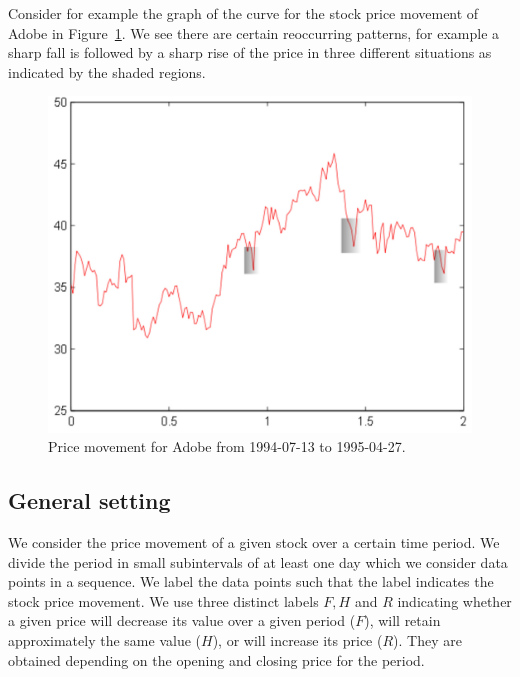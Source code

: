 \documentclass[10pt]{article}
\begin{document}
Consider for example the graph of the curve for the stock price movement of
Adobe in Figure~\ref{fig:adbe}. We see there are certain reoccurring patterns,
for example a sharp fall is followed by a sharp rise of the price in three
different situations as indicated by the shaded regions. 

\begin{figure}[t]
\centering%
\includegraphics[scale=0.3]{ADBE_new.pdf}
\caption{Price movement for Adobe from 1994-07-13 to 1995-04-27.}
\label{fig:adbe}
\end{figure}

\subsection{General setting}
We consider the price movement of a given stock over a certain time period. We
divide the period in small subintervals of at least one day which we consider
data points in a sequence.  We label the data points such that the label
indicates the stock price movement. We use three distinct labels $F, H$ and $R$
indicating whether a given price will decrease its value over a given period
($F$), will retain approximately the same value ($H$), or will increase its
price ($R$). They are obtained depending on the opening and closing price for
the period. 
\end{document}
